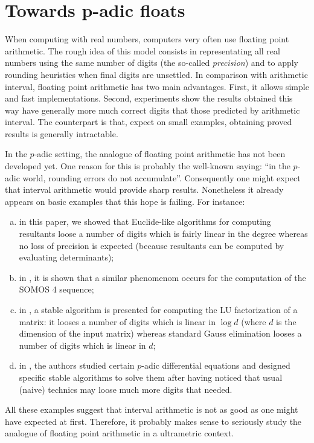 \documentclass{sig-alternate}
\begin{document}
\section{Towards p-adic floats}

When computing with real numbers, computers very often use floating 
point arithmetic. 
The rough idea of this model consists in representating all real numbers 
using the same number of digits (the so-called \emph{precision}) and to
apply rounding heuristics when final digits are unsettled.
In comparison with arithmetic interval, floating point arithmetic has
two main advantages. First, it allows simple and fast implementations.
Second, experiments show the results obtained this way have generally
more much correct digits that those predicted by arithmetic interval.
The counterpart is that, expect on small examples, obtaining proved
results is generally intractable.

In the $p$-adic setting, the analogue of floating point arithmetic has
not been developed yet. One reason for this is probably the well-known
saying: ``in the $p$-adic world, rounding errors do not accumulate''.
Consequently one might expect that interval arithmetic would provide
sharp results.
Nonetheless it already appears on basic examples that this hope is
failing. For instance:
\begin{enumerate}[a)]
\vspace{-0.25cm}
\item in this paper, we showed that Euclide-like algorithms for 
computing resultants loose a number of digits which is fairly linear in 
the degree whereas no loss of precision is expected (because resultants
can be computed by evaluating determinants);
\vspace{-0.25cm}
\item in \cite{}, it is shown that a similar phenomenom occurs for
the computation of the SOMOS 4 sequence;
\vspace{-0.25cm}
\item in \cite{}, a stable algorithm is presented for computing the LU 
factorization of a matrix: it looses a number of digits which is linear 
in $\log d$ (where $d$ is the dimension of the input matrix) whereas 
standard Gauss elimination looses a number of digits which is linear in 
$d$;
\vspace{-0.25cm}
\item in \cite{}, the authors studied certain $p$-adic differential
equations and designed specific stable algorithms to solve them after
having noticed that usual (naive) technics may loose much more digits 
that needed.
\end{enumerate}
\vspace{-0.2cm}
All these examples suggest that interval arithmetic is not as good as 
one might have expected at first. Therefore, it probably makes sense 
to seriously study the analogue of floating point arithmetic in a
ultrametric context.
\end{document}
